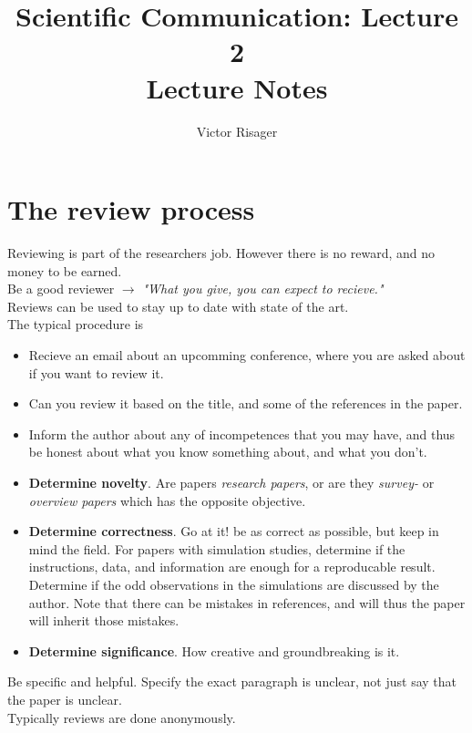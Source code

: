 \documentclass[a4paper]{article}
\title{Scientific Communication: Lecture 2 \\
	\large Lecture Notes}
\author{Victor Risager}
\begin{document}
\maketitle
\section{The review process}
Reviewing is part of the researchers job. However there is no reward, and no money to be earned. \\
Be a good reviewer $\rightarrow$ \textit{"What you give, you can expect to recieve."}  \\
Reviews can be used to stay up to date with state of the art. \\
The typical procedure is 
\begin{itemize}
	\item Recieve an email about an upcomming conference, where you are asked about if you want to review it. 
	\item Can you review it based on the title, and some of the references in the paper. 
	\item Inform the author about any of incompetences that you may have, and thus be honest about what you know something about, and what you don't.
	\item \textbf{Determine novelty}. Are papers \textit{research papers}, or are they \textit{survey-} or \textit{overview papers} which has the opposite objective.
	\item \textbf{Determine correctness}. Go at it! be as correct as possible, but keep in mind the field. For papers with simulation studies, determine if the instructions, data, and information are enough for a reproducable result. Determine if the odd observations in the simulations are discussed by the author. Note that there can be mistakes in references, and will thus the paper will inherit those mistakes. 
	\item \textbf{Determine significance}. How creative and groundbreaking is it. 
\end{itemize}

Be specific and helpful. Specify the exact paragraph is unclear, not just say that the paper is unclear. \\
Typically reviews are done anonymously. 
\end{document}
